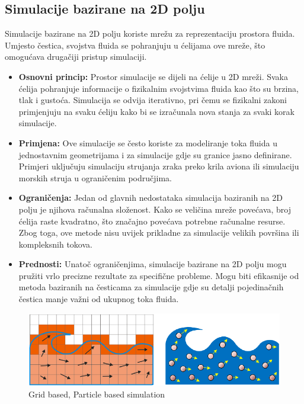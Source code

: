 \documentclass[diplomskirad]{fer}
\begin{document}
    \subsection{Simulacije bazirane na 2D polju}\label{subsec:simulacije-bazirane-na-polju}

    Simulacije bazirane na 2D polju koriste mrežu za reprezentaciju prostora fluida.
    Umjesto čestica, svojstva fluida se pohranjuju u ćelijama ove mreže, što omogućava drugačiji pristup simulaciji.

    \begin{itemize}
        \item \textbf{Osnovni princip:} Prostor simulacije se dijeli na ćelije u 2D mreži.
        Svaka ćelija pohranjuje informacije o fizikalnim svojstvima fluida kao što su brzina, tlak i gustoća.
        Simulacija se odvija iterativno, pri čemu se fizikalni zakoni primjenjuju na svaku ćeliju kako bi se izračunala nova stanja za svaki korak simulacije.
        \item \textbf{Primjena:} Ove simulacije se često koriste za modeliranje toka fluida u jednostavnim geometrijama i za simulacije gdje su granice jasno definirane.
        Primjeri uključuju simulaciju strujanja zraka preko krila aviona ili simulaciju morskih struja u ograničenim područjima.
        \item \textbf{Ograničenja:} Jedan od glavnih nedostataka simulacija baziranih na 2D polju je njihova računalna složenost.
        Kako se veličina mreže povećava, broj ćelija raste kvadratno, što značajno povećava potrebne računalne resurse.
        Zbog toga, ove metode nisu uvijek prikladne za simulacije velikih površina ili kompleksnih tokova.
        \item \textbf{Prednosti:} Unatoč ograničenjima, simulacije bazirane na 2D polju mogu pružiti vrlo precizne rezultate za specifične probleme.
        Mogu biti efikasnije od metoda baziranih na česticama za simulacije gdje su detalji pojedinačnih čestica manje važni od ukupnog toka fluida.
    \end{itemize}

    \begin{figure}[H]
        \centering
        \includegraphics[scale=0.5]{images/gridBasedParticleBased}
        \caption{
            Grid based, Particle based simulation \cite{gridBasedParticleBased}
        }
        \label{fig:gridBasedParticleBased}
    \end{figure}
\end{document}
